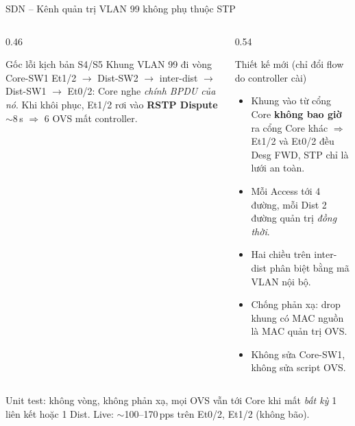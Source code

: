 \documentclass[aspectratio=169, 10pt]{beamer}
\begin{document}
\begin{frame}{SDN -- Kênh quản trị VLAN 99 không phụ thuộc STP}
    \begin{columns}[T]
        \begin{column}{0.46\textwidth}
            \begin{alertblock}{Gốc lỗi kịch bản S4/S5}
                \small
                Khung VLAN 99 đi vòng Core-SW1 Et1/2 $\rightarrow$ Dist-SW2 $\rightarrow$ inter-dist
                $\rightarrow$ Dist-SW1 $\rightarrow$ Et0/2: Core nghe \emph{chính BPDU của nó}.
                Khi khôi phục, Et1/2 rơi vào \textbf{RSTP Dispute} $\sim$8\,s $\Rightarrow$ 6 OVS mất controller.
            \end{alertblock}
        \end{column}
        \begin{column}{0.54\textwidth}
            \begin{exampleblock}{Thiết kế mới (chỉ đổi flow do controller cài)}
                \small
                \begin{itemize}
                    \item Khung vào từ cổng Core \textbf{không bao giờ} ra cổng Core khác $\Rightarrow$
                          Et1/2 và Et0/2 đều Desg FWD, STP chỉ là lưới an toàn.
                    \item Mỗi Access tới 4 đường, mỗi Dist 2 đường quản trị \emph{đồng thời}.
                    \item Hai chiều trên inter-dist phân biệt bằng mã VLAN nội bộ.
                    \item Chống phản xạ: drop khung có MAC nguồn là MAC quản trị OVS.
                    \item Không sửa Core-SW1, không sửa script OVS.
                \end{itemize}
            \end{exampleblock}
        \end{column}
    \end{columns}
    \vspace{0.15cm}
    \centering\scriptsize Unit test: không vòng, không phản xạ, mọi OVS vẫn tới Core khi mất \emph{bất kỳ} 1 liên kết hoặc 1 Dist. Live: $\sim$100--170\,pps trên Et0/2, Et1/2 (không bão).
\end{frame}
\end{document}
